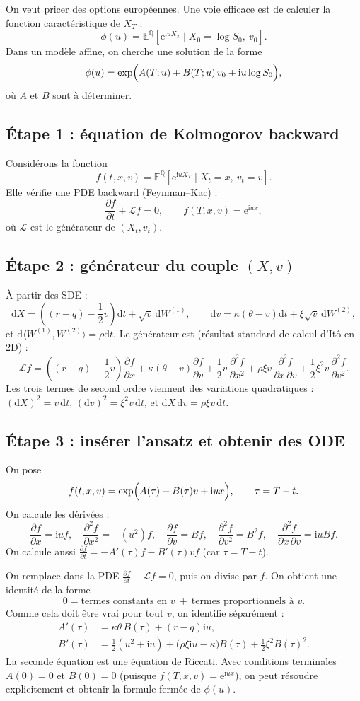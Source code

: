 \documentclass[11pt,a4paper]{report}
\newcommand{\dd}{\mathrm{d}}
\newcommand{\ee}{\mathrm{e}}
\newcommand{\ii}{\mathrm{i}}
\newcommand{\E}{\mathbb{E}}
\newcommand{\Q}{\mathbb{Q}}
\newcommand{\1}{\mathbbm{1}}
\newcommand{\pd}[2]{\frac{\partial #1}{\partial #2}}
\newcommand{\pdd}[2]{\frac{\partial^2 #1}{\partial #2^2}}
\theoremstyle{definition}
\theoremstyle{plain}
\theoremstyle{remark}
\begin{document}
On veut pricer des options européennes. Une voie efficace est de calculer la fonction caractéristique de $X_T$ :
\[
\phi(u) = \E^\Q\left[\ee^{\ii u X_T}\mid X_0=\log S_0,\ v_0\right].
\]
Dans un modèle affine, on cherche une solution de la forme
\[
\phi(u) = \exp\Bigl(A(T;u) + B(T;u)\,v_0 + \ii u \log S_0\Bigr),
\]
où $A$ et $B$ sont à déterminer.

\subsection{Étape 1 : équation de Kolmogorov backward}
Considérons la fonction
\[
f(t,x,v)=\E^\Q\left[\ee^{\ii u X_T}\mid X_t=x,\ v_t=v\right].
\]
Elle vérifie une PDE backward (Feynman--Kac) :
\[
\pd{f}{t} + \mathcal{L} f = 0,\qquad f(T,x,v)=\ee^{\ii u x},
\]
où $\mathcal{L}$ est le générateur de $(X_t,v_t)$.

\subsection{Étape 2 : générateur du couple $(X,v)$}
À partir des SDE :
\[
\dd X = \left((r-q)-\frac12 v\right)\dd t + \sqrt{v}\,\dd W^{(1)},\qquad
\dd v = \kappa(\theta-v)\dd t + \xi\sqrt{v}\,\dd W^{(2)},
\]
et $\dd\langle W^{(1)},W^{(2)}\rangle=\rho \dd t$.
Le générateur est (résultat standard de calcul d'Itô en 2D) :
\[
\mathcal{L}f
=
\left((r-q)-\frac12 v\right)\pd{f}{x}
+ \kappa(\theta-v)\pd{f}{v}
+ \frac12 v\,\pdd{f}{x}
+ \rho \xi v\,\pd{^2 f}{x\,\partial v}
+ \frac12 \xi^2 v\,\pdd{f}{v}.
\]
Les trois termes de second ordre viennent des variations quadratiques :
$(\dd X)^2=v\,\dd t$, $(\dd v)^2=\xi^2 v\,\dd t$, et $\dd X\,\dd v = \rho\xi v\,\dd t$.

\subsection{Étape 3 : insérer l'ansatz et obtenir des ODE}
On pose
\[
f(t,x,v)=\exp\Bigl(A(\tau)+B(\tau)v+\ii u x\Bigr),\qquad \tau=T-t.
\]
On calcule les dérivées :
\[
\pd{f}{x}=\ii u f,\quad \pdd{f}{x}=-(u^2)f,\quad
\pd{f}{v}=B f,\quad \pdd{f}{v}=B^2 f,\quad
\pd{^2 f}{x\,\partial v}=\ii u B f.
\]
On calcule aussi $\pd{f}{t} = -A'(\tau)f - B'(\tau) v f$ (car $\tau=T-t$).

On remplace dans la PDE $\pd{f}{t} + \mathcal{L} f=0$, puis on divise par $f$.
On obtient une identité de la forme
\[
0 = \text{termes constants en } v \ +\ \text{termes proportionnels à } v.
\]
Comme cela doit être vrai pour tout $v$, on identifie séparément :
\begin{align*}
A'(\tau) &= \kappa\theta\,B(\tau) + (r-q)\ii u,\\
B'(\tau) &= \frac12(u^2+\ii u) + \bigl(\rho\xi\ii u-\kappa\bigr)B(\tau) + \frac12\xi^2 B(\tau)^2.
\end{align*}
La seconde équation est une équation de Riccati.
Avec conditions terminales $A(0)=0$ et $B(0)=0$ (puisque $f(T,x,v)=\ee^{\ii u x}$),
on peut résoudre explicitement et obtenir la formule fermée de $\phi(u)$.
\end{document}

